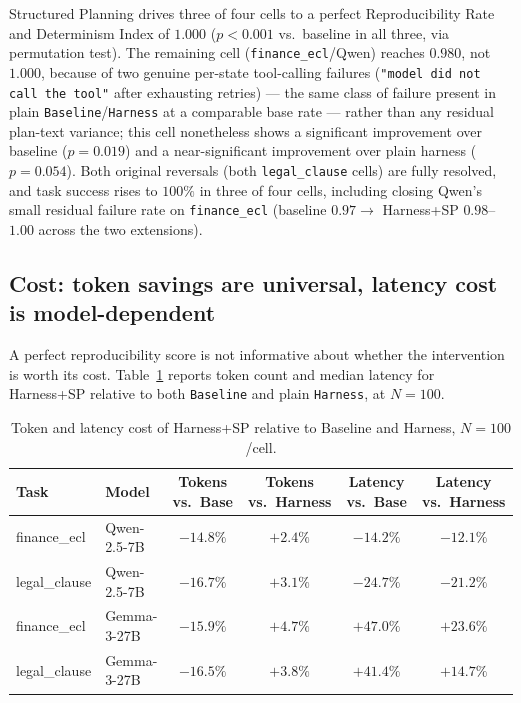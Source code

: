 \documentclass[11pt]{article}
\begin{document}
Structured Planning drives three of four cells to a perfect Reproducibility Rate and Determinism Index of $1.000$ ($p<0.001$ vs.\ baseline in all three, via permutation test). The remaining cell (\texttt{finance\_ecl}/Qwen) reaches $0.980$, not $1.000$, because of two genuine per-state tool-calling failures (\texttt{"model did not call the tool"} after exhausting retries) --- the same class of failure present in plain \texttt{Baseline}/\texttt{Harness} at a comparable base rate --- rather than any residual plan-text variance; this cell nonetheless shows a significant improvement over baseline ($p=0.019$) and a near-significant improvement over plain harness ($p=0.054$). Both original reversals (both \texttt{legal\_clause} cells) are fully resolved, and task success rises to $100\%$ in three of four cells, including closing Qwen's small residual failure rate on \texttt{finance\_ecl} (baseline $0.97 \rightarrow$ Harness+SP $0.98$--$1.00$ across the two extensions).

\subsection{Cost: token savings are universal, latency cost is model-dependent}

A perfect reproducibility score is not informative about whether the intervention is worth its cost. Table~\ref{tab:cost} reports token count and median latency for Harness+SP relative to both \texttt{Baseline} and plain \texttt{Harness}, at $N=100$.

\begin{table}[h]
\centering
\caption{Token and latency cost of Harness+SP relative to Baseline and Harness, $N=100$/cell.}
\label{tab:cost}
\begin{tabular}{@{}llcccc@{}}
\toprule
Task & Model & Tokens vs.\ Base & Tokens vs.\ Harness & Latency vs.\ Base & Latency vs.\ Harness \\
\midrule
finance\_ecl & Qwen-2.5-7B & $-14.8\%$ & $+2.4\%$ & $-14.2\%$ & $-12.1\%$ \\
legal\_clause & Qwen-2.5-7B & $-16.7\%$ & $+3.1\%$ & $-24.7\%$ & $-21.2\%$ \\
finance\_ecl & Gemma-3-27B & $-15.9\%$ & $+4.7\%$ & $+47.0\%$ & $+23.6\%$ \\
legal\_clause & Gemma-3-27B & $-16.5\%$ & $+3.8\%$ & $+41.4\%$ & $+14.7\%$ \\
\bottomrule
\end{tabular}
\end{table}
\end{document}

